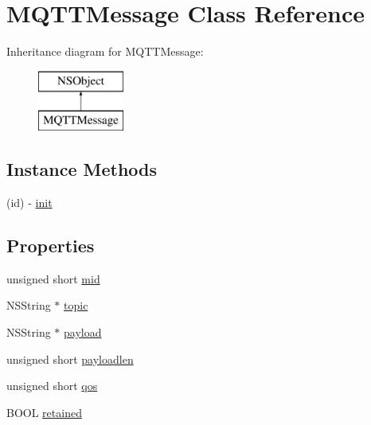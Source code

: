 \hypertarget{interface_m_q_t_t_message}{\section{M\-Q\-T\-T\-Message Class Reference}
\label{interface_m_q_t_t_message}
}
Inheritance diagram for M\-Q\-T\-T\-Message\-:\begin{figure}[H]
\begin{center}
\leavevmode
\includegraphics[height=2.000000cm]{interface_m_q_t_t_message}
\end{center}
\end{figure}
\subsection*{Instance Methods}
\begin{DoxyCompactItemize}
\item 
(id) -\/ \hyperlink{interface_m_q_t_t_message_a3a89c41b3fcd39e832f25c0e6e9729d0}{init}
\end{DoxyCompactItemize}
\subsection*{Properties}
\begin{DoxyCompactItemize}
\item 
unsigned short \hyperlink{interface_m_q_t_t_message_ae832d3bd3348f97c4a5bf86fd8e0c726}{mid}
\item 
N\-S\-String $\ast$ \hyperlink{interface_m_q_t_t_message_aea41fbd478102a49878498376a273705}{topic}
\item 
N\-S\-String $\ast$ \hyperlink{interface_m_q_t_t_message_ac2974959b4fca4589e4b6fc9f044f41e}{payload}
\item 
unsigned short \hyperlink{interface_m_q_t_t_message_af430192b287cfb6ef131f7e3d89249ef}{payloadlen}
\item 
unsigned short \hyperlink{interface_m_q_t_t_message_ae851052977c7286537111ec4072a1ab2}{qos}
\item 
B\-O\-O\-L \hyperlink{interface_m_q_t_t_message_aa7649c2ce6f7722f8038396744669389}{retained}
\end{DoxyCompactItemize}


